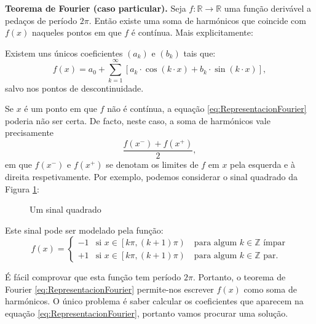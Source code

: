\begin{mybox}

\textbf{Teorema de Fourier (caso particular).} Seja $f:\mathbb{R}\rightarrow \mathbb{R}$ uma função derivável a pedaços de período $2\pi$. Então existe uma soma de harmónicos que coincide com $f(x)$  naqueles pontos em que $f$ é contínua. Mais explicitamente:

Existem uns únicos coeficientes  $(a_k)$ e $(b_k)$ tais que:
  \begin{equation} \label{eq:RepresentacionFourier}
    f(x) = a_0 + \sum_{k=1}^\infty [a_k\cdot \cos(k\cdot x) + b_k\cdot \sin(k\cdot x)],
  \end{equation}
salvo nos pontos de descontinuidade.
\end{mybox}
Se $x$ é um ponto em que $f$ não é contínua, a equação \eqref{eq:RepresentacionFourier} poderia não ser certa. De facto, neste caso, a soma de harmónicos vale precisamente
\[
\frac{f(x^-) + f(x^+)}{2},
\]
em que $f(x^-)$ e $f(x^+)$ se denotam os limites de $f$ em $x$ pela esquerda e à direita respetivamente.
Por exemplo, podemos considerar o sinal quadrado da Figura \ref{fig:SignalCuadrada}:
\begin{figure}[h]
\begin{figurebox}
    \vspace{5pt}
    \centering
    \scalebox{0.4}{ }
    \vspace{-10pt}
    \caption{Um sinal quadrado}
    \label{fig:SignalCuadrada}
\end{figurebox}
\end{figure}

Este sinal pode ser modelado pela função:
\begin{equation}
  \label{eq:SignalCuadrada}
  f(x) = 
  \begin{cases}
    -1 & \text{si } x\in\left[k\pi,(k+1)\pi\right)\quad\text{para algum }k\in\mathbb{Z}\text{ ímpar}\\
    +1  & \text{si } x\in\left[k\pi,(k+1)\pi\right)\quad\text{para algum }k\in\mathbb{Z}\text{ par}.
  \end{cases}
\end{equation}

É fácil comprovar que esta função tem período $2\pi$. Portanto, o teorema de Fourier \eqref{eq:RepresentacionFourier} permite-nos escrever $f(x)$ como soma de harmónicos. O único problema é saber calcular os coeficientes que aparecem na equação \eqref{eq:RepresentacionFourier}, portanto vamos procurar uma solução.

